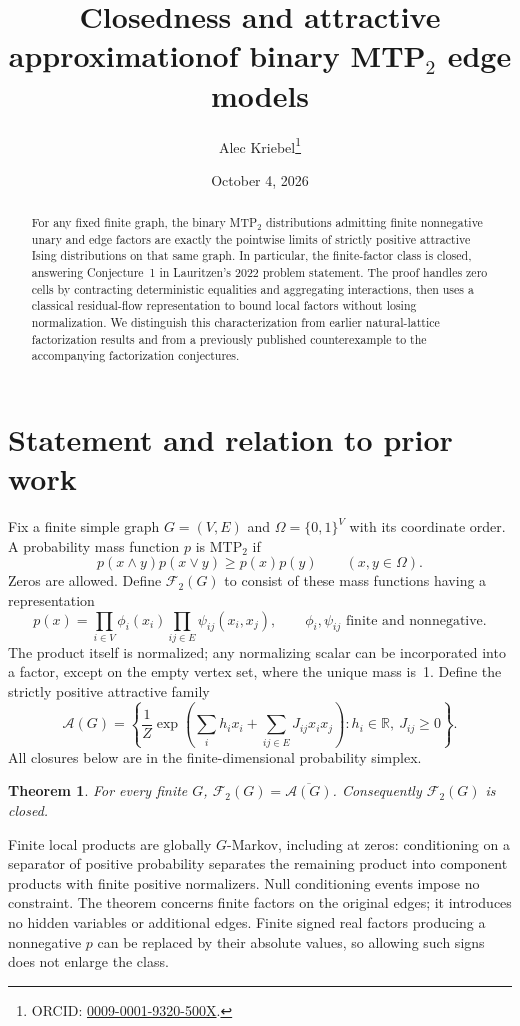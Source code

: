 \documentclass[11pt]{article}
\title{Closedness and attractive approximation\newline of binary MTP$_2$ edge models}
\author{Alec Kriebel\thanks{ORCID: \href{https://orcid.org/0009-0001-9320-500X}{0009-0001-9320-500X}.}}
\date{October 4, 2026}
\newtheorem{theorem}{Theorem}
\newcommand{\F}{\mathcal F_2(G)}
\newcommand{\A}{\mathcal A(G)}
\begin{document}
\maketitle
\begin{abstract}
For any fixed finite graph, the binary MTP$_2$ distributions admitting finite nonnegative unary and edge factors are exactly the pointwise limits of strictly positive attractive Ising distributions on that same graph. In particular, the finite-factor class is closed, answering Conjecture~1 in Lauritzen's 2022 problem statement. The proof handles zero cells by contracting deterministic equalities and aggregating interactions, then uses a classical residual-flow representation to bound local factors without losing normalization. We distinguish this characterization from earlier natural-lattice factorization results and from a previously published counterexample to the accompanying factorization conjectures.
\end{abstract}

\section{Statement and relation to prior work}
Fix a finite simple graph $G=(V,E)$ and $\Omega=\{0,1\}^V$ with its coordinate order. A probability mass function $p$ is MTP$_2$ if
\[
 p(x\wedge y)p(x\vee y)\geq p(x)p(y)\qquad(x,y\in\Omega).
\]
Zeros are allowed. Define $\F$ to consist of these mass functions having a representation
\begin{equation}\label{eq:finite}
 p(x)=\prod_{i\in V}\phi_i(x_i)\prod_{ij\in E}\psi_{ij}(x_i,x_j),
 \qquad \phi_i,\psi_{ij}\text{ finite and nonnegative}.
\end{equation}
The product itself is normalized; any normalizing scalar can be incorporated into a factor, except on the empty vertex set, where the unique mass is~1. Define the strictly positive attractive family
\begin{equation}\label{eq:attractive}
 \A=\left\{\frac{1}{Z}\exp\left(\sum_i h_i x_i+\sum_{ij\in E}J_{ij}x_ix_j\right):
 h_i\in\mathbb R,\ J_{ij}\geq0\right\}.
\end{equation}
All closures below are in the finite-dimensional probability simplex.

\begin{theorem}\label{thm:main}
For every finite $G$, $\F=\overline{\A}$. Consequently $\F$ is closed.
\end{theorem}

Finite local products are globally $G$-Markov, including at zeros: conditioning on a separator of positive probability separates the remaining product into component products with finite positive normalizers. Null conditioning events impose no constraint. The theorem concerns finite factors on the original edges; it introduces no hidden variables or additional edges. Finite signed real factors producing a nonnegative $p$ can be replaced by their absolute values, so allowing such signs does not enlarge the class.
\end{document}
